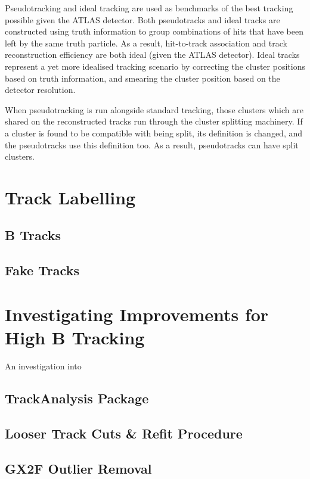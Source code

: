 Pseudotracking and ideal tracking are used as benchmarks of the best tracking possible given the ATLAS detector. Both pseudotracks and ideal tracks are constructed using truth information to group combinations of hits that have been left by the same truth particle. As a result, hit-to-track association and track reconstruction efficiency are both ideal (given the ATLAS detector). Ideal tracks represent a yet more idealised tracking scenario by correcting the cluster positions based on truth information, and smearing the cluster position based on the detector resolution.

When pseudotracking is run alongside standard tracking, those clusters which are shared on the reconstructed tracks run through the cluster splitting machinery. If a cluster is found to be compatible with being split, its definition is changed, and the pseudotracks use this definition too. As a result, pseudotracks can have split clusters.


\section{Track Labelling}\label{sec:track labelling}

\subsection{B Tracks}\label{sec:B track labelling}
\subsection{Fake Tracks}\label{sec:fake track labelling}

\section{Investigating Improvements for High \texorpdfstring{\pT}{pT} B Tracking}\label{sec:investigating tracking improvements}

An investigation into

\subsection{TrackAnalysis Package}\label{sec:track analysis package}
\subsection{Looser Track Cuts \& Refit Procedure}\label{sec:bcut and refit}
\subsection{GX2F Outlier Removal}\label{sec:gx2f outlier removal}

